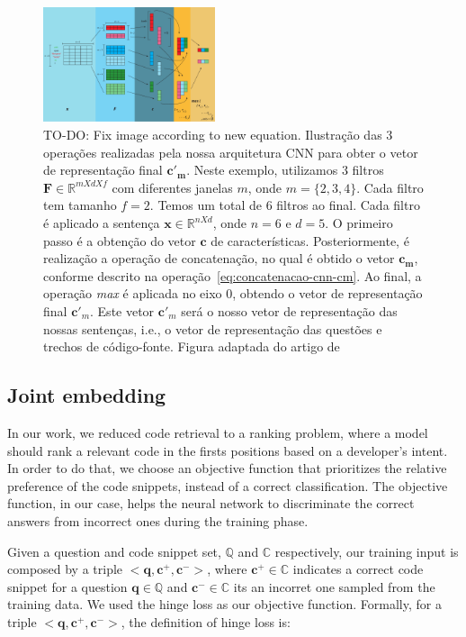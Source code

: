 \documentclass[sigconf]{acmart}
\begin{document}
\begin{figure}[H]
    \centering
    \includegraphics[width=0.45\textwidth]{figuras/cnn-steps-word-embedding.pdf}
    \caption{TO-DO: Fix image according to new equation. Ilustração das 3 operações realizadas pela nossa arquitetura CNN para obter o vetor de representação final $\bm{c'}_{\bm{m}}$. Neste exemplo, utilizamos 3 filtros $\bm{F} \in \mathbb{R}^{m X d X f}$ com diferentes janelas $m$, onde $m = \{2, 3, 4\}$. Cada filtro tem tamanho $f = 2$. Temos um total de 6 filtros ao final. Cada filtro é aplicado a sentença $\bm{x} \in \mathbb{R}^{n X d}$, onde $n = 6$ e $d = 5$. O primeiro passo é a obtenção do vetor $\bm{c}$ de características. Posteriormente, é realização a operação de concatenação, no qual é obtido o vetor $\bm{c}_{\bm{m}}$, conforme descrito na operação~\ref{eq:concatenacao-cnn-cm}. Ao final, a operação \textit{max} é aplicada no eixo $0$, obtendo o vetor de representação final $\bm{c'}_{m}$. Este vetor $\bm{c'}_{m}$ será o nosso vetor de representação das nossas sentenças, i.e., o vetor de representação das questões e trechos de código-fonte. Figura adaptada do artigo de \cite{zhang-guide-convolutional-cnn-embedding-ilustration:2015}}
    \label{fig:cnn-steps-word-embedding}
\end{figure}

\subsection{Joint embedding}

In our work, we reduced code retrieval to a ranking problem, where a model should rank a relevant code in the firsts positions based on a developer's intent. In order to do that, we choose an objective function that prioritizes the relative preference of the code snippets, instead of a correct classification. The objective function, in our case, helps the neural network to discriminate the correct answers from incorrect ones during the training phase.


Given a question and code snippet set, $\mathbb{Q}$ and $\mathbb{C}$ respectively, our training input is composed by a triple $<\bm{q}, \bm{c^{+}}, \bm{c^{-}}>$, where $\bm{c^{+}} \in \mathbb{C}$ indicates a correct code snippet for a question $\bm{q} \in \mathbb{Q}$ and $\bm{c^{-}} \in \mathbb{C}$ its an incorret one sampled from the training data. We used the hinge loss as our objective function. Formally, for a triple $<\bm{q}, \bm{c^{+}}, \bm{c^{-}}>$, the definition of hinge loss is:
\end{document}
